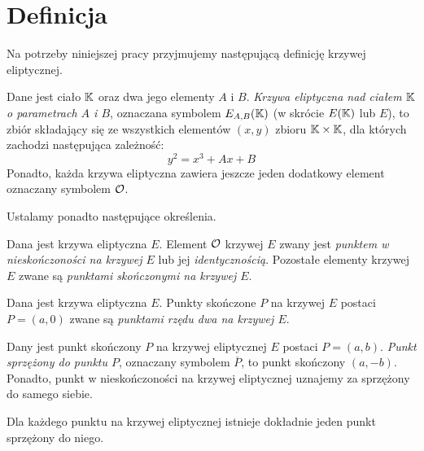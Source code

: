 \section{Definicja}

\noindent
Na potrzeby niniejszej pracy przyjmujemy
następującą definicję krzywej eliptycznej.

\begin{definition}\label{elliptic_curve_definition}
Dane jest ciało $\mathbb{K}$ oraz dwa jego elementy $A$ i $B$.
\emph{Krzywa eliptyczna nad ciałem $\mathbb{K}$ o parametrach $A$ i $B$},
oznaczana symbolem $E_{A,B}(\mathbb{K})$ (w skrócie $E(\mathbb{K})$ lub $E$),
to zbiór składający się
ze wszystkich elementów $(x, y)$ zbioru $\mathbb{K} \times \mathbb{K}$,
dla których zachodzi następująca zależność:
\begin{equation}\label{elliptic_curve_equation}
y^2 = x^3 + Ax + B
\end{equation}
Ponadto, każda krzywa eliptyczna zawiera jeszcze jeden dodatkowy element
oznaczany symbolem $\mathcal{O}$.
\end{definition}

\noindent
Ustalamy ponadto następujące określenia.

\begin{definition}
Dana jest krzywa eliptyczna $E$.
Element $\mathcal{O}$ krzywej $E$ zwany jest
\emph{punktem w nieskończoności na krzywej $E$} lub jej \emph{identycznością}.
Pozostałe elementy krzywej $E$
zwane są \emph{punktami skończonymi na krzywej $E$}.
\end{definition}

\begin{definition}
Dana jest krzywa eliptyczna $E$.
Punkty skończone $P$ na krzywej $E$ postaci $P = (a, 0)$
zwane są \emph{punktami rzędu dwa na krzywej $E$}.
\end{definition}

\begin{definition}
Dany jest punkt skończony $P$ na krzywej eliptycznej $E$ postaci $P = (a, b)$.
\emph{Punkt sprzężony do punktu $P$},
oznaczany symbolem $\overline{P}$,
to punkt skończony $(a, -b)$.
Ponadto, punkt w nieskończoności na krzywej eliptycznej
uznajemy za sprzężony do samego siebie.
\end{definition}

\begin{fact}\label{conjugate_exists_fact}
Dla każdego punktu na krzywej eliptycznej istnieje dokładnie jeden
punkt sprzężony do niego.
\end{fact}

